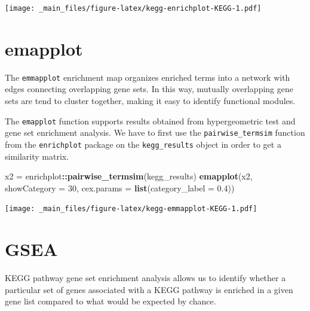 \documentclass[
]{book}
\newenvironment{Shaded}{\begin{snugshade}}{\end{snugshade}}
\newcommand{\AttributeTok}[1]{\textcolor[rgb]{0.13,0.29,0.53}{#1}}
\newcommand{\DecValTok}[1]{\textcolor[rgb]{0.00,0.00,0.81}{#1}}
\newcommand{\FloatTok}[1]{\textcolor[rgb]{0.00,0.00,0.81}{#1}}
\newcommand{\FunctionTok}[1]{\textcolor[rgb]{0.13,0.29,0.53}{\textbf{#1}}}
\newcommand{\NormalTok}[1]{#1}
\newcommand{\OtherTok}[1]{\textcolor[rgb]{0.56,0.35,0.01}{#1}}
\newcommand{\SpecialCharTok}[1]{\textcolor[rgb]{0.81,0.36,0.00}{\textbf{#1}}}
\begin{document}
\texttt{[image: \_main\_files/figure-latex/kegg-enrichplot-KEGG-1.pdf]}

\hypertarget{emapplot}{%
\section{emapplot}\label{emapplot}}

The \texttt{emmapplot} enrichment map organizes enriched terms into a network with edges connecting overlapping gene sets. In this way, mutually overlapping gene sets are tend to cluster together, making it easy to identify functional modules.

The \texttt{emapplot} function supports results obtained from hypergeometric test and gene set enrichment analysis. We have to first use the \texttt{pairwise\_termsim} function from the \texttt{enrichplot} package on the \texttt{kegg\_results} object in order to get a similarity matrix.

\begin{Shaded}
\begin{Highlighting}[]
\NormalTok{x2 }\OtherTok{=}\NormalTok{ enrichplot}\SpecialCharTok{::}\FunctionTok{pairwise\_termsim}\NormalTok{(kegg\_results)}
\FunctionTok{emapplot}\NormalTok{(x2, }
         \AttributeTok{showCategory =} \DecValTok{30}\NormalTok{,}
         \AttributeTok{cex.params =} \FunctionTok{list}\NormalTok{(}\AttributeTok{category\_label =} \FloatTok{0.4}\NormalTok{))}
\end{Highlighting}
\end{Shaded}

\texttt{[image: \_main\_files/figure-latex/kegg-emmapplot-KEGG-1.pdf]}

\hypertarget{gsea}{%
\section{GSEA}\label{gsea}}

KEGG pathway gene set enrichment analysis allows us to identify whether a particular set of genes associated with a KEGG pathway is enriched in a given gene list compared to what would be expected by chance.
\end{document}
